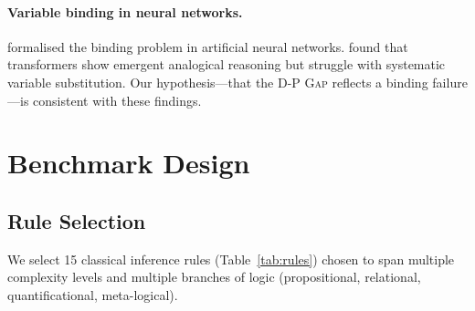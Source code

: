 \documentclass{article}
\newcommand{\dpgap}{\textsc{D-P Gap}}
\begin{document}
\paragraph{Variable binding in neural networks.}
\citet{greff2020binding} formalised the binding problem in
artificial neural networks.
\citet{webb2024systematic} found that transformers show emergent
analogical reasoning but struggle with systematic variable
substitution.
Our hypothesis---that the \dpgap{} reflects a binding failure---is
consistent with these findings.

\section{Benchmark Design}
\label{sec:benchmark}

\subsection{Rule Selection}

We select 15 classical inference rules (Table~\ref{tab:rules}) chosen
to span multiple complexity levels and multiple branches of logic
(propositional, relational, quantificational, meta-logical).
\end{document}

